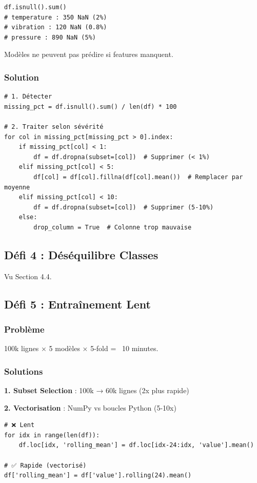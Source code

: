 \documentclass[12pt,a4paper,french]{article}
\begin{document}
\begin{lstlisting}
df.isnull().sum()
# temperature : 350 NaN (2%)
# vibration : 120 NaN (0.8%)
# pressure : 890 NaN (5%)
\end{lstlisting}

Modèles ne peuvent pas prédire si features manquent.

\subsubsection{Solution}

\begin{lstlisting}
# 1. Détecter
missing_pct = df.isnull().sum() / len(df) * 100

# 2. Traiter selon sévérité
for col in missing_pct[missing_pct > 0].index:
    if missing_pct[col] < 1:
        df = df.dropna(subset=[col])  # Supprimer (< 1%)
    elif missing_pct[col] < 5:
        df[col] = df[col].fillna(df[col].mean())  # Remplacer par moyenne
    elif missing_pct[col] < 10:
        df = df.dropna(subset=[col])  # Supprimer (5-10%)
    else:
        drop_column = True  # Colonne trop mauvaise
\end{lstlisting}

\subsection{Défi 4 : Déséquilibre Classes}

Vu Section 4.4.

\subsection{Défi 5 : Entraînement Lent}

\subsubsection{Problème}

100k lignes × 5 modèles × 5-fold = ~10 minutes.

\subsubsection{Solutions}

\textbf{1. Subset Selection} : 100k → 60k lignes (2x plus rapide)

\textbf{2. Vectorisation} : NumPy vs boucles Python (5-10x)

\begin{lstlisting}
# ❌ Lent
for idx in range(len(df)):
    df.loc[idx, 'rolling_mean'] = df.loc[idx-24:idx, 'value'].mean()

# ✅ Rapide (vectorisé)
df['rolling_mean'] = df['value'].rolling(24).mean()
\end{lstlisting}
\end{document}
